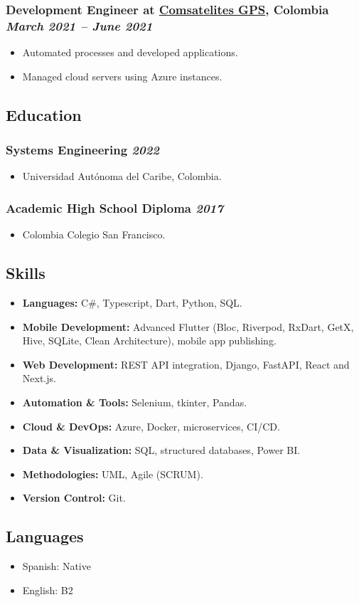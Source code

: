 \documentclass[a4paper,10pt]{article}
\begin{document}
\subsubsection*{%
  \textbf{Development Engineer} at \href{https://www.linkedin.com/company/comsatech/}{Comsatelites GPS}, Colombia
  \hfill
  \textit{March 2021 -- June 2021}
}
\begin{itemize}
  \item Automated processes and developed applications.
  \item Managed cloud servers using Azure instances.
\end{itemize}


\subsection*{Education}
\subsubsection*{\textbf{Systems Engineering} \hfill \textit{2022}}
\begin{itemize}
  \item Universidad Autónoma del Caribe, Colombia.
\end{itemize}

\subsubsection*{\textbf{Academic High School Diploma} \hfill \textit{2017}}
\begin{itemize}
  \item Colombia Colegio San Francisco.
\end{itemize}

\subsection*{Skills}
\begin{itemize}
  \item \textbf{Languages:} C\#, Typescript, Dart, Python, SQL.
  \item \textbf{Mobile Development:} Advanced Flutter (Bloc, Riverpod, RxDart, GetX, Hive, SQLite, Clean Architecture), mobile app publishing.
  \item \textbf{Web Development:} REST API integration, Django, FastAPI, React and Next.js.
  \item \textbf{Automation \& Tools:} Selenium, tkinter, Pandas.
  \item \textbf{Cloud \& DevOps:} Azure, Docker, microservices, CI/CD.
  \item \textbf{Data \& Visualization:} SQL, structured databases, Power BI.
  \item \textbf{Methodologies:} UML, Agile (SCRUM).
  \item \textbf{Version Control:} Git.
\end{itemize}

\subsection*{Languages}
\begin{itemize}
  \item Spanish: Native
  \item English: B2
\end{itemize}
\end{document}
